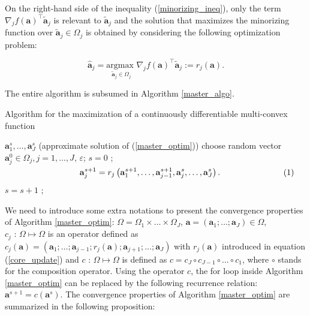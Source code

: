 \documentclass[
]{jss}
\begin{document}
On the right-hand side of the inequality (\ref{minorizing_ineq}), only
the term \(\nabla_jf( \mathbf a)^\top\tilde{ \mathbf a}_j\) is relevant
to \(\tilde{ \mathbf a}_j\) and the solution that maximizes the
minorizing function over \(\tilde{ \mathbf a}_j\in\Omega_j\) is obtained
by considering the following optimization problem:

\begin{equation}
\hat{ \mathbf a}_j = \underset{\tilde{ \mathbf a}_j\in\Omega_j}{\text{argmax }} \nabla_j f( \mathbf a)^\top \tilde{ \mathbf a}_j := r_j( \mathbf a).
\label{core_update}
\end{equation}

The entire algorithm is subsumed in Algorithm \ref{master_algo}.

\begin{algorithm}[!ht]
    \caption{Algorithm for the maximization of a continuously differentiable multi-convex function}
    \begin{algorithmic}[1]
         {$\mathbf a_1^s, \ldots,  \mathbf a_J^s$ (approximate solution of (\ref{master_optim}))}
         {choose random vector $\mathbf a_j^0\in\Omega_j, j =1, \ldots, J$, $\varepsilon$;}
        \STATE$s = 0$ ;
        \REPEAT
        \STATE \hspace{-2cm}$\vcenter{\begin{equation}
             \mathbf a_j^{s+1} = r_j\left(  \mathbf a_1^{s+1}, \ldots,  \mathbf a_{j-1}^{s+1},  \mathbf a_j^{s}, \ldots,  \mathbf a_J^{s}\right).
        \end{equation}}$
        \ENDFOR
        \STATE$s = s + 1$ ;
    \end{algorithmic}
    \label{master_algo}
\end{algorithm}

We need to introduce some extra notations to present the convergence
properties of Algorithm \ref{master_optim}:
\(\Omega = \Omega_1 \times \ldots \times \Omega_J\),
\(\mathbf a = \left( \mathbf a_1; \ldots; \mathbf a_J\right) \in \Omega\),
\(c_j \text{ : } \Omega\mapsto\Omega\) is an operator defined as
\(c_j( \mathbf a) = \left( \mathbf a_1; \ldots; \mathbf a_{j-1} ; r_j( \mathbf a) ; \mathbf a_{j+1} ; \ldots; \mathbf a_J\right)\)
with \(r_j( \mathbf a)\) introduced in equation (\ref{core_update}) and
\(c \text{ : } \Omega\mapsto\Omega\) is defined as
\(c = c_J\circ c_{J-1}\circ ... \circ c_1\), where \(\circ\) stands for
the composition operator. Using the operator \(c\), the
\guillemotleft for loop\guillemotright{} inside Algorithm
\ref{master_optim} can be replaced by the following recurrence relation:
\(\mathbf a^{s+1} = c( \mathbf a^s)\). The convergence properties of
Algorithm \ref{master_optim} are summarized in the following
proposition:
\end{document}
